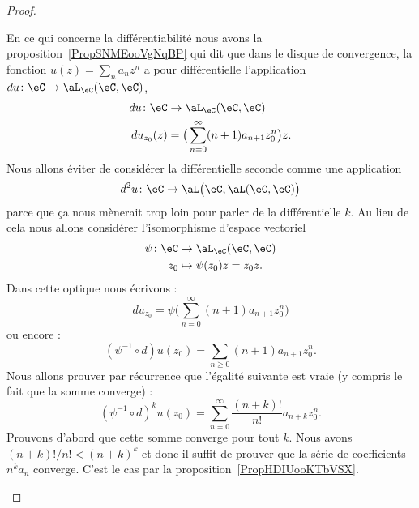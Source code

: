 \begin{proof}
\begin{subproof}
		En ce qui concerne la différentiabilité nous avons la proposition~\ref{PropSNMEooVgNqBP} qui dit que dans le disque de convergence, la fonction \( u(z)=\sum_na_nz^n\) a pour différentielle l'application \( du\colon \eC\to \aL_{\eC}(\eC,\eC)\),
		\begin{equation}
			\begin{aligned}
				du\colon \eC & \to \aL_{\eC}(\eC,\eC)                              \\
				du_{z_0}(z)  & =\big( \sum_{n=0}^{\infty}(n+1)a_{n+1}z_0^n \big)z.
			\end{aligned}
		\end{equation}
		Nous allons éviter de considérer la différentielle seconde comme une application
		\begin{equation}
			d^2u\colon \eC\to \aL\big( \eC,\aL(\eC,\eC) \big)
		\end{equation}
		parce que ça nous mènerait trop loin pour parler de la différentielle \( k\)\ieme. Au lieu de cela nous allons considérer l'isomorphisme d'espace vectoriel
		\begin{equation}
			\begin{aligned}
				\psi\colon \eC & \to \aL_{\eC}(\eC,\eC)    \\
				z_0            & \mapsto \psi(z_0) z=z_0z.
			\end{aligned}
		\end{equation}
		Dans cette optique nous écrivons :
		\begin{equation}
			du_{z_0}=\psi\big( \sum_{n=0}^{\infty}(n+1)a_{n+1} z_0^n\big)
		\end{equation}
		ou encore :
		\begin{equation}
			(\psi^{-1}\circ d)u(z_0)=\sum_{n\geq 0}(n+1)a_{n+1}z_{0}^n.
		\end{equation}
		Nous allons prouver par récurrence que l'égalité suivante est vraie (y compris le fait que la somme converge) :
		\begin{equation}
			(\psi^{-1}\circ d)^ku(z_0)=\sum_{n=0}^{\infty}\frac{ (n+k)! }{ n! }a_{n+k}z_0^n.
		\end{equation}
		Prouvons d'abord que cette somme converge pour tout \( k\). Nous avons \( (n+k)!/n!<(n+k)^k\) et donc il suffit de prouver que la série de coefficients \( n^ka_n\) converge. C'est le cas par la proposition~\ref{PropHDIUooKTbVSX}.


\end{subproof}
\end{proof}
